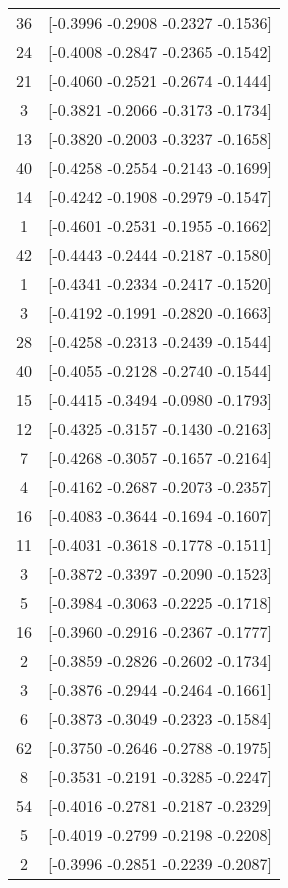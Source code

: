 \documentclass[12pt, fullpage,letterpaper]{article}
\begin{document}
\begin{enumerate}
\begin{enumerate}
{\begin{longtable}{|c|c|}
			 36 &  [-0.3996 -0.2908 -0.2327 -0.1536] \\
			 24 &  [-0.4008 -0.2847 -0.2365 -0.1542] \\
			 21 &  [-0.4060 -0.2521 -0.2674 -0.1444] \\
			  3 &  [-0.3821 -0.2066 -0.3173 -0.1734] \\
			 13 &  [-0.3820 -0.2003 -0.3237 -0.1658] \\
			 40 &  [-0.4258 -0.2554 -0.2143 -0.1699] \\
			 14 &  [-0.4242 -0.1908 -0.2979 -0.1547] \\
			  1 &  [-0.4601 -0.2531 -0.1955 -0.1662] \\
			 42 &  [-0.4443 -0.2444 -0.2187 -0.1580] \\
			  1 &  [-0.4341 -0.2334 -0.2417 -0.1520] \\
			  3 &  [-0.4192 -0.1991 -0.2820 -0.1663] \\
			 28 &  [-0.4258 -0.2313 -0.2439 -0.1544] \\
			 40 &  [-0.4055 -0.2128 -0.2740 -0.1544] \\
			 15 &  [-0.4415 -0.3494 -0.0980 -0.1793] \\
			 12 &  [-0.4325 -0.3157 -0.1430 -0.2163] \\
			  7 &  [-0.4268 -0.3057 -0.1657 -0.2164] \\
			  4 &  [-0.4162 -0.2687 -0.2073 -0.2357] \\
			 16 &  [-0.4083 -0.3644 -0.1694 -0.1607] \\
			 11 &  [-0.4031 -0.3618 -0.1778 -0.1511] \\
			  3 &  [-0.3872 -0.3397 -0.2090 -0.1523] \\
			  5 &  [-0.3984 -0.3063 -0.2225 -0.1718] \\
			 16 &  [-0.3960 -0.2916 -0.2367 -0.1777] \\
			  2 &  [-0.3859 -0.2826 -0.2602 -0.1734] \\
			  3 &  [-0.3876 -0.2944 -0.2464 -0.1661] \\
			  6 &  [-0.3873 -0.3049 -0.2323 -0.1584] \\
			 62 &  [-0.3750 -0.2646 -0.2788 -0.1975] \\
			  8 &  [-0.3531 -0.2191 -0.3285 -0.2247] \\
			 54 &  [-0.4016 -0.2781 -0.2187 -0.2329] \\
			  5 &  [-0.4019 -0.2799 -0.2198 -0.2208] \\
			  2 &  [-0.3996 -0.2851 -0.2239 -0.2087] \\

\end{longtable}}
\end{enumerate}
\end{enumerate}
\end{document}
